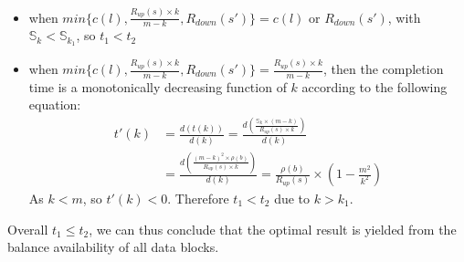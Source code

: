 \begin{itemize}
\item when $min\{c(l),\frac{R_{up}(s)\times k}{m-k},R_{down}(s')\} = c(l)$ or $R_{down}(s')$, with $\mathbb{S}_k<\mathbb{S}_{k_1}$, so $t_1<t_2$
    
\item when $min\{c(l),\frac{R_{up}(s)\times k}{m-k},R_{down}(s')\} = \frac{R_{up}(s)\times k}{m-k}$, then the completion time is a monotonically decreasing function of $k$ according to the following equation:
\begin{equation}
\label{calculus}
\begin{split}
t'(k) &= \frac{d(t(k))}{d(k)} = \frac{d(\frac{\mathbb{S}_k\times (m-k)}{R_{up}(s)\times k})}{d(k)} \\
    &= \frac{d(\frac{(m-k)^2\times \rho(b)}{R_{up}(s)\times k})}{d(k)} = \frac{\rho(b)}{R_{up}(s)} \times (1-\frac{m^2}{k^2})
\end{split}
\end{equation}
As $k<m$, so $t'(k)<0$. Therefore $t_1<t_2$ due to $k>k_1$.
\end{itemize}


Overall $t_1\leq t_2$, we can thus conclude that the optimal result is yielded from the balance availability of all data blocks.

%
%

